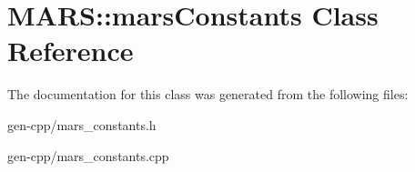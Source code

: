 \hypertarget{classMARS_1_1marsConstants}{}\section{M\+A\+RS\+:\+:mars\+Constants Class Reference}
\label{classMARS_1_1marsConstants}


The documentation for this class was generated from the following files\+:\begin{DoxyCompactItemize}
\item 
gen-\/cpp/mars\+\_\+constants.\+h\item 
gen-\/cpp/mars\+\_\+constants.\+cpp\end{DoxyCompactItemize}
